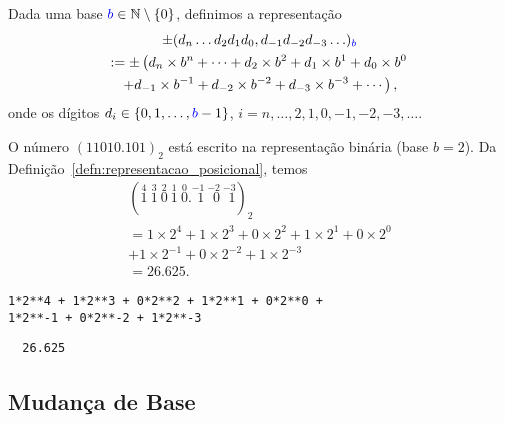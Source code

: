 \begin{defn}\label{defn:representacao_posicional}
  Dada uma base ${\color{blue}b}\in\mathbb{N}\setminus \{0\}$, definimos a representação
  \begin{gather}
    \pm (d_n\ldots d_2d_1d_0,d_{-1}d_{-2}d_{-3}\ldots)_{\color{blue}b} \\
    := \pm \left(d_n\times b^n + \cdots + d_2\times b^2 + d_1\times b^1 + d_0\times b^0\right. \\
      \left. + d_{-1}\times b^{-1} + d_{-2}\times b^{-2} + d_{-3}\times b^{-3} + \cdots\right),
  \end{gather}
onde os dígitos $d_i\in\{0, 1, \dotsc, {\color{blue}b}-1\}$, $i=n, \dotsc, 2, 1, 0, -1, -2, -3, \ldots$.
\end{defn}

\begin{ex}\label{ex:base_binaria}
  O número $(11010.101)_2$ está escrito na representação binária (base $b=2$). Da Definição~\ref{defn:representacao_posicional}, temos
  \begin{gather}
    (\stackrel{4}{1}~\stackrel{3}{1}~\stackrel{2}{0}~\stackrel{1}{1}~\stackrel{0}{0}.\stackrel{-1}{~\,1}~\stackrel{-2}{~\,0}~\stackrel{-3}{~\,1})_2\\
    = 1\times 2^4 + 1\times 2^3 + 0\times 2^2 + 1\times 2^1 + 0\times 2^0\\
    + 1\times 2^{-1} + 0\times 2^{-2} + 1\times 2^{-3}\\
    = 26.625.
  \end{gather}

\begin{lstlisting}
1*2**4 + 1*2**3 + 0*2**2 + 1*2**1 + 0*2**0 +
1*2**-1 + 0*2**-2 + 1*2**-3
\end{lstlisting}

\begin{verbatim}
  26.625
\end{verbatim}
\end{ex}

\subsection{Mudança de Base}

